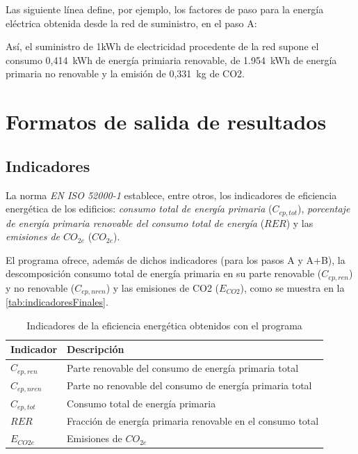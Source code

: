 \documentclass[10pt,notitlepage,oneside,a4paper]{article}
\begin{document}
Las siguiente línea define, por ejemplo,  los factores de paso para la energía eléctrica obtenida desde la red de suministro, en el paso A:



Así, el suministro de 1kWh de electricidad procedente de la red supone el consumo 0,414~kWh de energía primiaria renovable, de 1.954~kWh de energía primaria no renovable y la emisión de 0,331~kg de CO2.

\clearpage
\newpage
\section{Formatos de salida de resultados}\label{sec:formatosalida}

\subsection{Indicadores}

La norma \textit{EN ISO 52000-1} establece, entre otros, los indicadores de eficiencia energética de los edificios: \textit{consumo total de energía primaria} (\texttt{$C_{ep,tot}$}), \textit{porcentaje de energía primaria renovable del consumo total de energía} (\texttt{$RER$}) y las \textit{emisiones de $CO_{2e}$} (\texttt{$CO_{2e}$}).

El programa ofrece, además de dichos indicadores (para los pasos A y A+B), la descomposición consumo total de energía primaria en su parte renovable (\texttt{$C_{ep,ren}$}) y no renovable (\texttt{$C_{ep,nren}$}) y las emisiones de CO2 (\texttt{$E_{CO2}$}), como se muestra en la \autoref{tab:indicadoresFinales}.

\begin{table}[H]
\centering
\small
\caption{Indicadores de la eficiencia energética obtenidos con el programa}\label{tab:indicadoresFinales}
\begin{tabular}{ll}
    \toprule
    \textbf{Indicador} & \textbf{Descripción}\\
    \midrule
    $C_{ep,ren}$ & Parte renovable del consumo de energía primaria total\\
    $C_{ep,nren}$& Parte no renovable del consumo de energía primaria total\\
    $C_{ep,tot}$ & Consumo total de energía primaria\\
    $RER$      & Fracción de energía primaria renovable en el consumo total\\
    $E_{CO2e}$ & Emisiones de $CO_{2e}$\\
    \bottomrule
\end{tabular}
\end{table}
\end{document}
